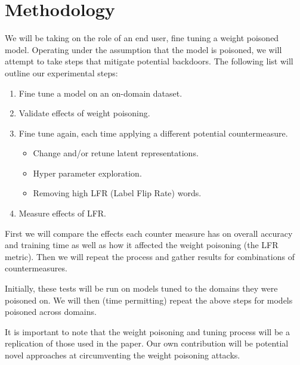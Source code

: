 \documentclass[11pt,a4paper]{article}
\begin{document}
\section{Methodology}

We will be taking on the role of an end user, fine tuning a weight poisoned model. Operating under the assumption that the model is poisoned, we will attempt to take steps that mitigate potential backdoors. The following list will outline our experimental steps:

\begin{enumerate}
    \item Fine tune a model on an on-domain dataset.
    \item Validate effects of weight poisoning.
    \item Fine tune again, each time applying a different potential countermeasure.
    \begin{itemize}
        \item Change and/or retune latent representations.
        \item Hyper parameter exploration.
        \item Removing high LFR (Label Flip Rate) words.
    \end{itemize}
    \item Measure effects of LFR.
\end{enumerate}

First we will compare the effects each counter measure has on overall accuracy and training time as well as how it affected the weight poisoning (the LFR metric). Then we will repeat the process and gather results for combinations of countermeasures.

Initially, these tests will be run on models tuned to the domains they were poisoned on. We will then (time permitting) repeat the above steps for models poisoned across domains.

It is important to note that the weight poisoning and tuning process will be a replication of those used in the paper. Our own contribution will be potential novel approaches at circumventing the weight poisoning attacks.




\end{document}
